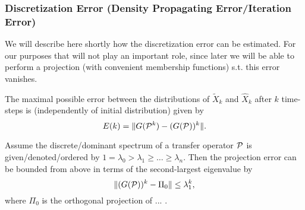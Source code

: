 


\subsubsection*{Discretization Error (Density Propagating Error/Iteration Error)}
We will describe here shortly how the discretization error can be estimated. For our purposes that will not play an important role, since later we will be able to perform a projection (with convenient membership functions) s.t. this error vanishes. 

The maximal possible error between the distributions of $\widetilde{X}_k$ and $\widehat{X}_k$ after $k$ time-steps is (independently of initial distribution) given by 
\begin{equation*}
E(k) = \Vert G(\mathcal{P}^k) - (G (\mathcal{P}))^k\Vert.
\end{equation*}

\begin{thm}
Assume the discrete/dominant spectrum of a transfer operator $\mathcal{P}$ is given/denoted/ordered by $1=\lambda_0 > \lambda_1 \geq \dots \geq \lambda_n$. Then the projection error can be bounded from above in terms of the second-largest eigenvalue by
\begin{equation*}
\Vert (G (\mathcal{P}))^k - \Pi_0\Vert \leq \lambda_1^k,
\end{equation*}
where $\Pi_0$ is the orthogonal projection of ... .
\end{thm}

